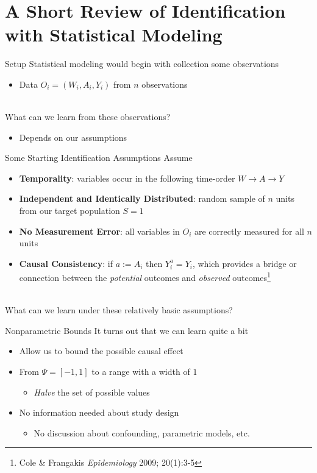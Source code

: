 \documentclass[aspectratio=169]{beamer}
\begin{document}
\section{A Short Review of Identification with Statistical Modeling}

\begin{frame}{Setup}
	Statistical modeling would begin with collection some observations
	\begin{itemize}
		\item Data $O_i = (W_i, A_i, Y_i)$ from $n$ observations
	\end{itemize}
	~\\
	What can we learn from these observations?
	\begin{itemize}
		\item Depends on our assumptions
	\end{itemize}
\end{frame}

\begin{frame}{Some Starting Identification Assumptions}
	Assume
	\begin{itemize}
		\item[1.] \textbf{Temporality}: variables occur in the following time-order $W \rightarrow A \rightarrow Y$
		\item[2.] \textbf{Independent and Identically Distributed}: random sample of $n$ units from our target population $S=1$
		\item[3.] \textbf{No Measurement Error}: all variables in $O_i$ are correctly measured for all $n$ units
		\item[4.] \textbf{Causal Consistency}: if $a := A_i$ then $Y_i^a = Y_i$, which provides a bridge or connection between the \textit{potential} outcomes and \textit{observed} outcomes\footnote[frame]{Cole \& Frangakis \textit{Epidemiology} 2009; 20(1):3-5}
	\end{itemize}
	~\\
	What can we learn under these relatively basic assumptions?
\end{frame}

\begin{frame}{Nonparametric Bounds}
	It turns out that we can learn quite a bit
	\begin{itemize}
		\item Allow us to bound the possible causal effect
		\item From $\Psi = [-1, 1]$ to a range with a width of $1$
		\begin{itemize}
			\item \textit{Halve} the set of possible values
		\end{itemize}
		\item No information needed about study design
		\begin{itemize}
			\item No discussion about confounding, parametric models, etc.
		\end{itemize}
	\end{itemize}
\end{frame}
\end{document}
